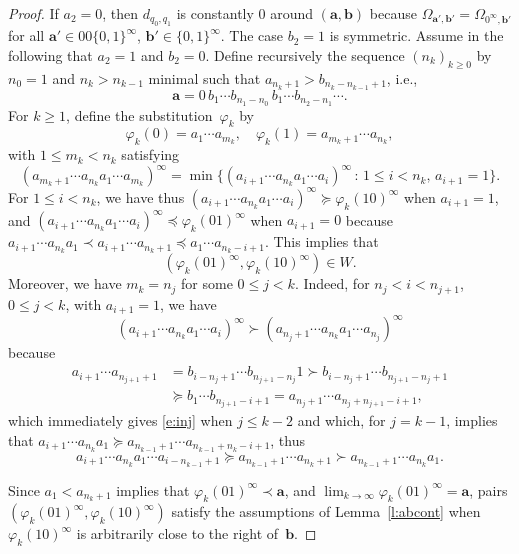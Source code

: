 \documentclass{amsart}
\theoremstyle{definition}
\numberwithin{equation}{section}
\newcommand{\ba}{\mathbf{a}}
\newcommand{\bb}{\mathbf{b}}
\begin{document}
\begin{proof}
If $a_2 = 0$, then $d_{q_0,q_1}$ is constantly 0 around $(\ba,\bb)$ because $\Omega_{\ba',\bb'} = \Omega_{0^\infty,\bb'}$ for all $\ba' \in 00\{0,1\}^\infty$, $\bb' \in \{0,1\}^\infty$.
The case $b_2 = 1$ is symmetric.
Assume in the following that $a_2 = 1$ and $b_2 = 0$. 
Define recursively the sequence $(n_k)_{k\ge0}$ by $n_0 = 1$ and $n_k > n_{k-1}$ minimal such that $a_{n_k+1} > b_{n_k-n_{k-1}+1}$, i.e., 
\[
\ba = 0\, b_1 \cdots b_{n_1-n_0}\, b_1 \cdots b_{n_2-n_1} \cdots.
\]
For $k \ge 1$, define the substitution~$\varphi_k$ by
\[
\varphi_k(0) = a_1 \cdots a_{m_k}, \quad \varphi_k(1) = a_{m_k+1} \cdots a_{n_k},
\]
with $1 \le m_k < n_k$ satisfying
\[
(a_{m_k+1} \cdots a_{n_k} a_1\cdots a_{m_k})^\infty = \min \{(a_{i+1} \cdots a_{n_k} a_1\cdots a_i)^\infty \,:\, 1 \le i < n_k,\, a_{i+1} = 1\}.
\]
For $1 \le i < n_k$, we have thus $(a_{i+1} \cdots a_{n_k} a_1\cdots a_i)^\infty \succeq \varphi_k(10)^\infty$ when $a_{i+1} = 1$, and $(a_{i+1} \cdots a_{n_k} a_1\cdots a_i)^\infty \preceq \varphi_k(01)^\infty$ when $a_{i+1} = 0$ because $a_{i+1} \cdots a_{n_k} a_1 \prec a_{i+1} \cdots a_{n_k+1} \preceq a_1 \cdots a_{n_k-i+1}$.
This implies that
\[
(\varphi_k(01)^\infty, \varphi_k(10)^\infty) \in W.
\]
Moreover, we have $m_k = n_j$ for some $0 \le j < k$.
Indeed, for $n_j < i < n_{j+1}$, $0 \le j < k$, with $a_{i+1} = 1$, we have
\begin{equation} \label{e:inj}
(a_{i+1} \cdots a_{n_k} a_1\cdots a_i)^\infty \succ (a_{n_j+1} \cdots a_{n_k} a_1\cdots a_{n_j})^\infty
\end{equation}
because
\begin{equation} \label{e:anj}
\begin{aligned}
a_{i+1} \cdots a_{n_{j+1}+1} & = b_{i-n_j+1} \cdots b_{n_{j+1}-n_j} 1 \succ b_{i-n_j+1} \cdots b_{n_{j+1}-n_j+1} \\
& \succeq b_1 \cdots b_{n_{j+1}-i+1} = a_{n_j+1} \cdots a_{n_j+n_{j+1}-i+1},
\end{aligned}
\end{equation}
which immediately gives \eqref{e:inj} when $j \le k{-}2$ and which, for $j = k{-}1$, implies that $a_{i+1} \cdots a_{n_k} a_1 \succeq a_{n_{k-1}+1} \cdots a_{n_{k-1}+n_k-i+1}$, thus
\[
a_{i+1} \cdots a_{n_k} a_1 \cdots a_{i-n_{k-1}+1} \succeq a_{n_{k-1}+1} \cdots a_{n_k+1} \succ a_{n_{k-1}+1} \cdots a_{n_k} a_1.
\]

Since $a_1 < a_{n_k+1}$ implies that $\varphi_k(01)^\infty \prec \ba$, and $\lim_{k\to\infty} \varphi_k(01)^\infty = \ba$, pairs $(\varphi_k(01)^\infty, \varphi_k(10)^\infty)$ satisfy the assumptions of Lemma~\ref{l:abcont} when $\varphi_k(10)^\infty$ is arbitrarily close to the right of~$\bb$.


\end{proof}
\end{document}

